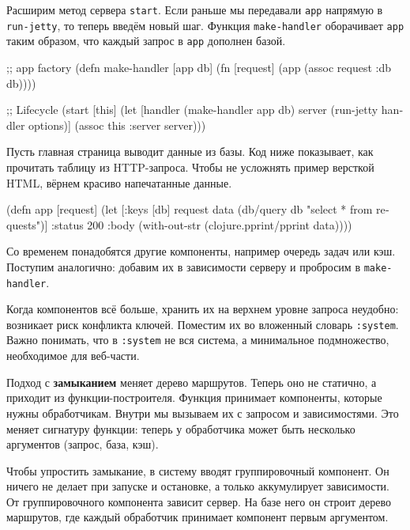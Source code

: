 Расширим метод сервера \verb|start|. Если раньше мы передавали \verb|app|
напрямую в \verb|run-jetty|, то теперь введём новый шаг. Функция
\verb|make-handler| оборачивает \verb|app| таким образом, что каждый запрос
в \verb|app| дополнен базой.

\begin{english}
  \begin{clojure}
;; app factory
(defn make-handler [app db]
  (fn [request]
    (app (assoc request :db db))))

;; Lifecycle
(start [this]
  (let [handler (make-handler app db)
        server (run-jetty handler options)]
    (assoc this :server server)))
  \end{clojure}
\end{english}

Пусть главная страница выводит данные из базы. Код ниже показывает, как
прочитать таблицу из HTTP-запроса. Чтобы не усложнять пример версткой HTML,
вёрнем красиво напечатанные данные.

\begin{english}
  \begin{clojure}
(defn app [request]
  (let [{:keys [db]} request
        data (db/query db "select * from requests")]
    {:status 200
     :body (with-out-str
             (clojure.pprint/pprint data))}))
  \end{clojure}
\end{english}

Со временем понадобятся другие компоненты, например очередь задач или
кэш. Поступим аналогично: добавим их в зависимости серверу и пробросим в
\verb|make-handler|.


Когда компонентов всё больше, хранить их на верхнем уровне запроса неудобно:
возникает риск конфликта ключей. Поместим их во вложенный словарь
\verb|:system|. Важно понимать, что в \verb|:system| не вся система, а
минимальное подмножество, необходимое для веб-части.


Подход с \textbf{замыканием} меняет дерево маршрутов. Теперь оно не статично, а
приходит из функции-построителя. Функция принимает компоненты, которые нужны
обработчикам. Внутри мы вызываем их с запросом и зависимостями. Это меняет
сигнатуру функции: теперь у обработчика может быть несколько аргументов (запрос,
база, кэш).

Чтобы упростить замыкание, в систему вводят группировочный компонент. Он ничего
не делает при запуске и остановке, а только аккумулирует зависимости. От
группировочного компонента зависит сервер. На базе него он строит дерево
маршрутов, где каждый обработчик принимает компонент первым аргументом.

